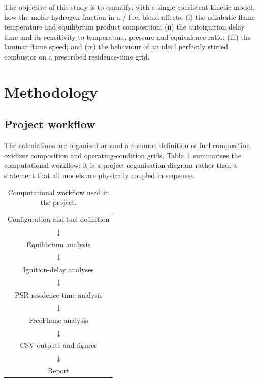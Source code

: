 \documentclass[11pt]{article}
\begin{document}
The objective of this study is to quantify, with a single consistent kinetic
model, how the molar hydrogen fraction in a / fuel blend affects:
(i) the adiabatic flame temperature and equilibrium product composition;
(ii) the autoignition delay time and its sensitivity to temperature, pressure
and equivalence ratio; (iii) the laminar flame speed; and (iv) the behaviour
of an ideal perfectly stirred combustor on a prescribed residence-time grid.

\clearpage

\section{Methodology}

\subsection{Project workflow}
The calculations are organised around a common definition of fuel composition,
oxidizer composition and operating-condition grids. Table~\ref{tab:workflow} summarises the computational workflow; it is a
project organisation diagram rather than a statement that all models are
physically coupled in sequence.

\begin{table}[htbp]
  \centering
  \caption{Computational workflow used in the project.}
  \label{tab:workflow}
  \begin{tabular}{c}
    \toprule
    Configuration and fuel definition \\
    $\downarrow$ \\
    Equilibrium analysis \\
    $\downarrow$ \\
    Ignition-delay analyses \\
    $\downarrow$ \\
    PSR residence-time analysis \\
    $\downarrow$ \\
    FreeFlame analysis \\
    $\downarrow$ \\
    CSV outputs and figures \\
    $\downarrow$ \\
    Report \\
    \bottomrule
  \end{tabular}
\end{table}
\end{document}
